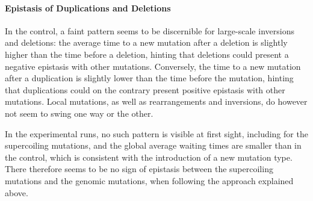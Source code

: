\paragraph{Epistasis of Duplications and Deletions}
In the control, a faint pattern seems to be discernible for large-scale inversions and deletions: the average time to a new mutation after a deletion is slightly higher than the time before a deletion, hinting that deletions could present a negative epistasis with other mutations.
Conversely, the time to a new mutation after a duplication is slightly lower than the time before the mutation, hinting that duplications could on the contrary present positive epistasis with other mutations.
Local mutations, as well as rearrangements and inversions, do however not seem to swing one way or the other.

In the experimental runs, no such pattern is visible at first sight, including for the supercoiling mutations, and the global average waiting times are smaller than in the control, which is consistent with the introduction of a new mutation type.
There therefore seems to be no sign of epistasis between the supercoiling mutations and the genomic mutations, when following the approach explained above.

